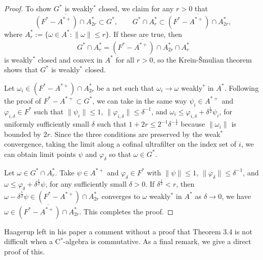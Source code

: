 \documentclass[noamsfonts,a4paper,10pt]{amsart}
\theoremstyle{plain}
\theoremstyle{definition}
\begin{document}
\begin{proof}
To show $G^*$ is weakly$^*$ closed, we claim for any $r>0$ that 
\[\overline{(F^*-A^{*+})\cap A_{2r}^*}\subset G^*,\qquad G^*\cap A_r^*\subset\overline{(F^*-A^{*+})\cap A_{2r}^*},\]
where $A_r^*:=\{\omega\in A^*:\|\omega\|\le r\}$.
If these are true, then
\[G^*\cap A_r^*=\overline{(F^*-A^{*+})\cap A_{2r}^*}\cap A_r^*\]
is weakly$^*$ closed and convex in $A^*$ for all $r>0$, so the Krein-\v Smulian theorem shows that $G^*$ is weakly$^*$ closed.

Let $\omega_i\in(F^*-A^{*+})\cap A_{2r}^*$ be a net such that $\omega_i\to\omega$ weakly$^*$ in $A^*$.
Following the proof of $F^*-A^{*+}\subset G^*$, we can take in the same way $\psi_i\in A^{*+}$ and $\varphi_{i,\delta}\in F^*$ such that $\|\psi_i\|\le1$, $\|\varphi_{i,\delta}\|\le\delta^{-1}$, and $\omega_i\le\varphi_{i,\delta}+\delta^{\frac12}\psi_i$, for uniformly sufficiently small $\delta$ such that $1+2r\le2^{-1}\delta^{-\frac14}$ because $\|\omega_i\|$ is bounded by $2r$.
Since the three conditions are preserved by the weak$^*$ convergence, taking the limit along a cofinal ultrafilter on the index set of $i$, we can obtain limit points $\psi$ and $\varphi_\delta$ so that $\omega\in G^*$.

Let $\omega\in G^*\cap A_r^*$.
Take $\psi\in A^{*+}$ and $\varphi_\delta\in F^*$ with $\|\psi\|\le1$, $\|\varphi_\delta\|\le\delta^{-1}$, and $\omega\le\varphi_\delta+\delta^{\frac12}\psi$, for any sufficiently small $\delta>0$.
If $\delta^{\frac12}<r$, then $\omega-\delta^{\frac12}\psi\in(F^*-A^{*+})\cap A_{2r}^*$ converges to $\omega$ weakly$^*$ in $A^*$ as $\delta\to0$, we have $\omega\in\overline{(F^*-A^{*+})\cap A_{2r}^*}$.
This completes the proof.
\end{proof}

Haagerup left in his paper \cite{MR380438} a comment without a proof that Theorem 3.4 is not difficult when a C$^*$-algebra is commutative.
As a final remark, we give a direct proof of this.
\end{document}
